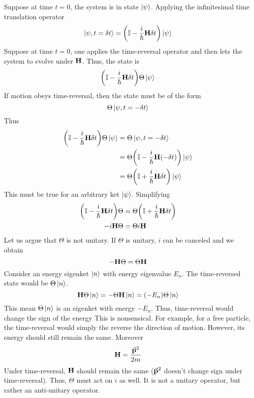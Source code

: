 \documentclass[12pt,a4paper,titlepage]{article}
\begin{document}
Suppose at time $t=0$, the system is in state $\ket{\psi}$. Applying the infinitesimal time translation operator
\begin{equation}
\ket{\psi,t=\delta t}=\qty(\mathbb{I}-\frac{i}{\hbar}\vb{H}\delta t)\ket{\psi}
\end{equation}
Suppose at time $t=0$, one applies the time-reversal operator and then lets the system to evolve under $\vb{H}$. Thus, the state is
\[
\qty(\mathbb{I}-\frac{i}{\hbar}\vb{H}\delta t)\Theta\ket{\psi}
\]
If motion obeys time-reversal, then the state must be of the form
\[
\Theta\ket{\psi,t=-\delta t}
\]
Thus
\begin{equation}
\begin{aligned}
\qty(\mathbb{I}-\frac{i}{\hbar}\vb{H}\delta t)\Theta\ket{\psi}&=\Theta\ket{\psi,t=-\delta t}\\
&=\Theta\qty(\mathbb{I}-\frac{i}{\hbar}\vb{H}(-\delta t))\ket{\psi}\\
&=\Theta\qty(\mathbb{I}+\frac{i}{\hbar}\vb{H}\delta t)\ket{\psi}
\end{aligned}
\end{equation}
This must be true for an arbitrary ket $\ket{\psi}$. Simplifying
\begin{equation}
\begin{aligned}
\qty(\mathbb{I}-\frac{i}{\hbar}\vb{H}\delta t)\Theta&=\Theta\qty(\mathbb{I}+\frac{i}{\hbar}\vb{H}\delta t)\\
-i\vb{H}\Theta&=\Theta i\vb{H}
\end{aligned}
\end{equation}
Let us argue that $\Theta$ is not unitary. If $\Theta$ is unitary, $i$ can be canceled and we obtain
\begin{equation}
-\vb{H}\Theta=\Theta\vb{H}
\end{equation}
Consider an energy eigenket $\ket{n}$ with energy eigenvalue $E_{n}$. The time-reversed state would be $\Theta\ket{n}$.
\begin{equation}
\vb{H}\Theta\ket{n}=-\Theta\vb{H}\ket{n}=(-E_{n})\Theta\ket{n}
\end{equation}
This mean $\Theta\ket{n}$ is an eigenket with energy $-E_{n}$. Thus, time-reversal would change the sign of the energy This is nonsensical. For example, for a free particle, the time-reversal would simply the reverse the direction of motion. However, its energy should still remain the same. Moreover
\begin{equation}
\vb{H}=\frac{\vec{\vb{p}}^{2}}{2m}
\end{equation}
Under time-reversal, $\vb{H}$ should remain the same ($\vec{\vb{p}}^{2}$ doesn't change sign under time-reversal). Thus, $\Theta$ must act on $i$ as well. It is not a unitary operator, but rather an anti-unitary operator.\\
\end{document}
